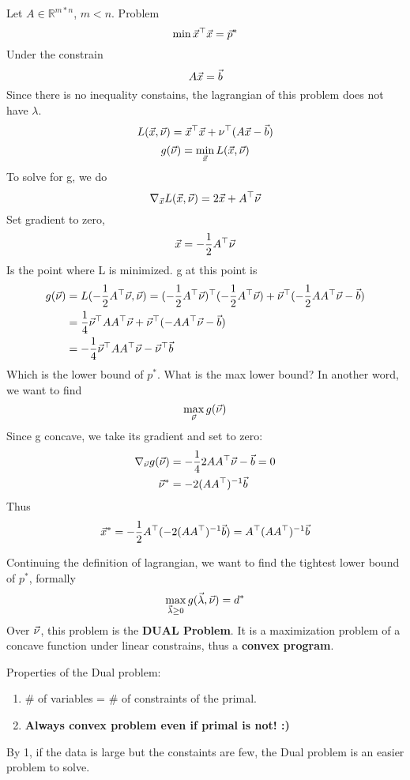 \begin{example}[Duality on LS]
	Let $A\in\mathbb{R}^{m*n}$, $m<n$. Problem
	\[
\min \vec{x}^\top\vec{x} = \vec{p}^*
	\]
	Under the constrain
	\[
A\vec{x} = \vec{b}
	\]
	Since there is no inequality constains, the lagrangian of this problem does not have $\lambda$.
	\[
L(\vec{x},\vec{\nu}) = \vec{x}^\top\vec{x} + \nu^\top(A\vec{x}-\vec{b})
	\]
	\[
g(\vec{\nu}) = \min_{\vec{x}}L(\vec{x},\vec{\nu})
	\]
	To solve for g, we do
	\[
\nabla_{\vec{x}} L(\vec{x},\vec{\nu}) = 2\vec{x}+A^\top\vec{\nu}
	\]
	Set gradient to zero,
	\[
\vec{x} = -\frac{1}{2}A^\top\vec{\nu}
	\]
	Is the point where L is minimized. g at this point is 
	\begin{align*}
		g(\vec{\nu}) &= L(-\frac{1}{2}A^\top\vec{\nu}, \vec{\nu}) = (-\frac{1}{2}A^\top\vec{\nu})^\top(-\frac{1}{2}A^\top\vec{\nu})+\vec{\nu}^\top(-\frac{1}{2}AA^\top\vec{\nu}-\vec{b})\\
		&=\frac{1}{4}\vec{\nu}^\top A A^\top\vec{\nu} +\vec{\nu}^\top(-AA^\top\vec{\nu}-\vec{b})\\
		&= -\frac{1}{4}\vec{\nu}^\top A A^\top\vec{\nu} - \vec{\nu}^\top\vec{b}
	\end{align*}
	Which is the lower bound of $p^*$. What is the max lower bound? In another word, we want to find
	\[
\max_{\vec{\nu}}g(\vec{\nu})
	\]
	Since g concave, we take its gradient and set to zero:
	\begin{align*}
		\nabla_{\vec{\nu}} g(\vec{\nu}) &= -\frac{1}{4}2AA^\top\vec{\nu}-\vec{b} = 0\\
		\vec{\nu}^* &= -2(AA^\top)^{-1}\vec{b}
	\end{align*}
	Thus
	\[
\vec{x}^* = -\frac{1}{2}A^\top(-2(AA^\top)^{-1}\vec{b}) = A^\top(AA^\top)^{-1}\vec{b}
	\]
\end{example}

\begin{definition}[Dual]
	Continuing the definition of lagrangian, we want to find the tightest lower bound of $p^*$, formally
	\[
\max_{\vec{\lambda}\ge0}g(\vec{\lambda},\vec{\nu}) = d^*
	\]
	Over $\vec{\nu}$, this problem is the \textbf{DUAL Problem}. It is a maximization problem of a concave function under linear constrains, thus a \textbf{convex program}.
\end{definition}

\begin{remark}
	Properties of the Dual problem:
	\begin{enumerate}
		\item \# of variables = \# of constraints of the primal.
		\item \textbf{Always convex problem even if primal is not! :)}
	\end{enumerate}
	By 1, if the data is large but the constaints are few, the Dual problem is an easier problem to solve.
\end{remark}

